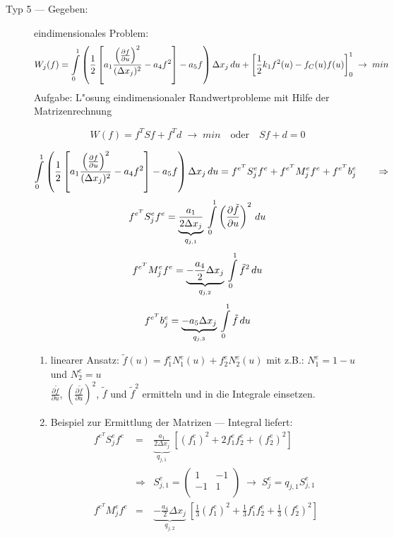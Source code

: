 \begin{description}
\item[Typ 5 --- Gegeben:] eindimensionales Problem:
     $$W_j(f)=\int\limits_0^1 \left(\frac{1}{2} \left[ a_1
     \frac{\left(\frac{\partial f}{\partial u}\right)^2}{(\Delta x_j)^2} - a_4
     f^2 \right] -a_5 f \right) \Delta x_j \, du + \left[ \frac{1}{2} k_1
     f^2(u) -f_C(u)f(u)\right]_0^1 \; \rightarrow\; min$$
     Aufgabe: L"osung eindimensionaler Randwertprobleme mit Hilfe der
     Matrizenrechnung

     $$W(f)=f^TSf + f^Td \;\rightarrow\; min \quad \mbox{oder}\quad Sf+d=0$$

     $$\int\limits_0^1 \left(\frac{1}{2} \left[ a_1
       \frac{\left(\frac{\partial f}{\partial u}\right)^2}{(\Delta x_j)^2} - a_4
       f^2 \right] -a_5 f \right) \Delta x_j \, du = f^{e^T} S_j^e f^e + f^{e^T}
       M_j^e f^e + f^{e^T} b_j^e \qquad \Rightarrow$$
     $$f^{e^T} S_j^e f^e = \underbrace{\frac{a_1}{2\Delta x_j}}_{q_{j,1}}\: \int\limits_0^1
       \left(\frac{\partial \tilde{f}}{\partial u} \right)^2\, du $$
     $$f^{e^T} M_j^e f^e = \underbrace{-\frac{a_4}{2} \Delta x_j}_{q_{j,2}}\: \int\limits_0^1 \tilde{f}^2
       \, du$$
     $$f^{e^T} b_j^e = \underbrace{-a_5 \Delta x_j}_{q_{j,3}}\: \int\limits_0^1 \tilde{f}\, du$$
   \begin{enumerate}
   \item linearer Ansatz: $\tilde{f}(u)=f_1^eN_1^e(u)+f_2^eN_2^e(u)$ mit z.B.: $N_1^e
         = 1-u$ und $N_2^e = u$ \\ $\frac{\partial \tilde{f}}{\partial u}$,
         $\left(\frac{\partial \tilde{f}}{\partial u}\right)^2$, $\tilde{f}$ und
         $\tilde{f}^2$ ermitteln und in die Integrale einsetzen.
   \item Beispiel zur Ermittlung der Matrizen --- Integral liefert:
         \begin{eqnarray*}
         f^{e^T} S_j^e f^e &=& \underbrace{\frac{a_1}{2\Delta x_j}}_{q_{j,1}}\:
         \left[\left(f_1^e\right)^2+2f_1^ef_2^e+\left(f_2^e\right)^2 \right] \\
         &\Rightarrow& S_{j,1}^e = \left(\begin{array}{cc}1&-1\\-1&1\\
         \end{array} \right) \; \rightarrow\; S_j^e=q_{j,1}S_{j,1}^e \\
         f^{e^T} M_j^e f^e &=& \underbrace{-\frac{a_4}{2} \Delta x_j}_{q_{j,2}}\:
         \left[ \frac{1}{3} \left(f_1^e\right)^2 + \frac{1}{3} f_1^ef_2^e +
          \frac{1}{3} \left(f_2^e\right)^2 \right] \\

\end{eqnarray*}
\end{enumerate}
\end{description}
